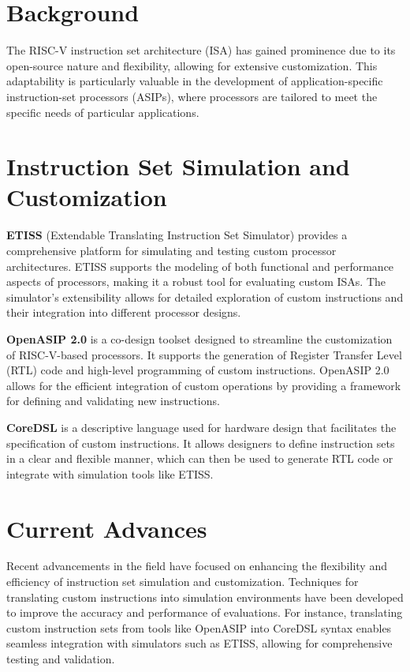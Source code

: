 \section*{Background}

The RISC-V instruction set architecture (ISA) has gained prominence due to its open-source nature and flexibility, allowing for extensive customization.
This adaptability is particularly valuable in the development of application-specific instruction-set processors (ASIPs),
where processors are tailored to meet the specific needs of particular applications.

\section*{Instruction Set Simulation and Customization}

\textbf{ETISS} (Extendable Translating Instruction Set Simulator) \cite{ETISS} provides a comprehensive platform for simulating and testing custom processor architectures.
ETISS supports the modeling of both functional and performance aspects of processors, making it a robust tool for evaluating custom ISAs.
The simulator's extensibility allows for detailed exploration of custom instructions and their integration into different processor designs.

\textbf{OpenASIP 2.0} \cite{OpenASIP} is a co-design toolset designed to streamline the customization of RISC-V-based processors.
It supports the generation of Register Transfer Level (RTL) code and high-level programming of custom instructions.
OpenASIP 2.0 allows for the efficient integration of custom operations by providing a framework for defining and validating new instructions.

\textbf{CoreDSL} \cite{CoreDSL} is a descriptive language used for hardware design that facilitates the specification of custom instructions.
It allows designers to define instruction sets in a clear and flexible manner, which can then be used to generate RTL code or integrate with simulation tools like ETISS.

\section*{Current Advances}

Recent advancements in the field have focused on enhancing the flexibility and efficiency of instruction set simulation and customization.
Techniques for translating custom instructions into simulation environments have been developed to improve the accuracy and performance of evaluations.
For instance, translating custom instruction sets from tools like OpenASIP into CoreDSL syntax enables seamless integration with simulators such as ETISS,
allowing for comprehensive testing and validation.

